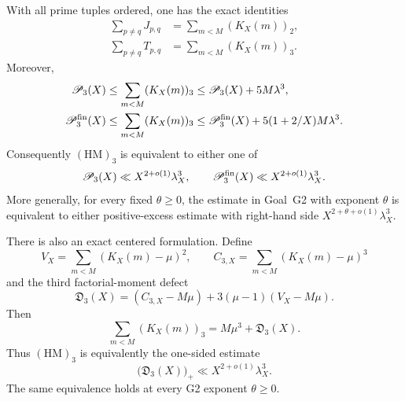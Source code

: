 \begin{theorem}
\label{thm:hm3-palm-characterization}
With all prime tuples ordered, one has the exact identities
\begin{align}
  \sum_{p\ne q}J_{p,q}
    &=\sum_{m<M}(K_X(m))_2,                              \label{eq:hm3-F2-id}\\
  \sum_{p\ne q}T_{p,q}
    &=\sum_{m<M}(K_X(m))_3.                              \label{eq:hm3-F3-id}
\end{align}
Moreover,
\begin{align}
  \mathscr P_3(X)
  &\le \sum_{m<M}(K_X(m))_3
  \le \mathscr P_3(X)+5M\lambda^3,                     \label{eq:hm3-palm-sandwich}\\
  \mathscr P_3^{\rm fin}(X)
  &\le \sum_{m<M}(K_X(m))_3
  \le \mathscr P_3^{\rm fin}(X)
       +5(1+2/X)M\lambda^3.                             \label{eq:hm3-palm-fin-sandwich}
\end{align}
Consequently $(\mathrm{HM})_3$ is equivalent to either one of
\[
  \mathscr P_3(X)\ll X^{2+o(1)}\lambda_X^3,
  \qquad
  \mathscr P_3^{\rm fin}(X)\ll X^{2+o(1)}\lambda_X^3.
\]
More generally, for every fixed $\theta\ge0$, the estimate in Goal~G2
with exponent $\theta$ is equivalent to either positive-excess estimate
with right-hand side $X^{2+\theta+o(1)}\lambda_X^3$.

There is also an exact centered formulation.  Define
\[
  V_X=\sum_{m<M}(K_X(m)-\mu)^2,
  \qquad
  C_{3,X}=\sum_{m<M}(K_X(m)-\mu)^3
\]
and the third factorial-moment defect
\begin{equation}
  \mathfrak D_3(X)
  =(C_{3,X}-M\mu)+3(\mu-1)(V_X-M\mu).                  \label{eq:hm3-defect-def}
\end{equation}
Then
\begin{equation}
  \sum_{m<M}(K_X(m))_3=M\mu^3+\mathfrak D_3(X).        \label{eq:hm3-defect-id}
\end{equation}
Thus $(\mathrm{HM})_3$ is equivalently the one-sided estimate
\[
  \bigl(\mathfrak D_3(X)\bigr)_+
  \ll X^{2+o(1)}\lambda_X^3.
\]
The same equivalence holds at every G2 exponent $\theta\ge0$.
\end{theorem}

